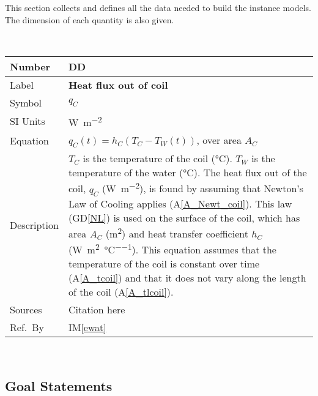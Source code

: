 \documentclass[12pt]{article}
\newcommand{\colAwidth}{0.13\textwidth}
\newcommand{\colBwidth}{0.82\textwidth}
\newcounter{defnum} %
\newcommand{\dref}[1]{GD\ref{#1}}
\newcounter{datadefnum} %
\newcommand{\aref}[1]{A\ref{#1}}
\newcommand{\iref}[1]{IM\ref{#1}}
\begin{document}
This section collects and defines all the data needed to build the instance models. The dimension
of each quantity is also given. 

~\newline

\noindent
\begin{minipage}{\textwidth}
	\renewcommand*{\arraystretch}{1.5}
	\begin{tabular}{| p{\colAwidth} | p{\colBwidth}|}
		\hline
		\rowcolor[gray]{0.9}
		Number   & DD{datadefnum}\thedatadefnum \label{FluxCoil} \\
		\hline
		Label    & \bf Heat flux out of coil                                    \\
		\hline
		Symbol   & $q_C$                                                        \\
		\hline
		SI Units & \si{\watt\per\square\metre}                                  \\ \hline Equation & $q_C(t) = h_C (T_C - T_W(t))$, over
		area $A_C$                                                              \\ \hline Description & $T_C$ is the temperature of the coil (\si{\celsius}). $T_W$ is
		   the temperature of the water (\si{\celsius}). The heat flux out of the coil, $q_C$
		   (\si{\watt\per\square\metre}), is found by assuming that Newton's Law of Cooling applies
		   (\aref{A_Newt_coil}). This law (\dref{NL}) is used on the surface of the coil, which has area $A_C$
		   (\si{\square\metre}) and heat transfer coefficient $h_C$ (\si{\watt\per\square\metre\per\celsius}).
		   This equation assumes that the temperature of the coil is constant over time (\aref{A_tcoil}) and
		that it does not vary along the length of the coil (\aref{A_tlcoil}).   \\ \hline Sources & Citation
		here                                                                    \\ \hline Ref.\ By & \iref{ewat}\\ \hline
	\end{tabular}
\end{minipage}\\

\subsection{Goal Statements}
\end{document}
